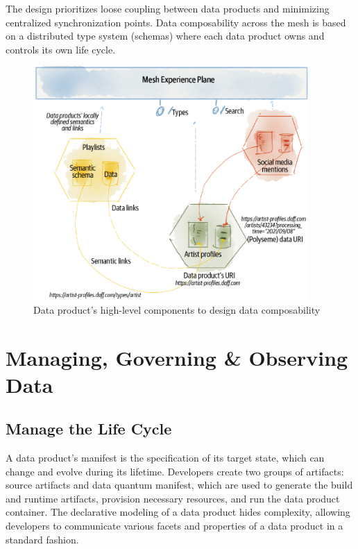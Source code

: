 \documentclass[12pt, a4paper]{book}
\begin{document}
The design prioritizes loose coupling between data products and minimizing centralized synchronization points. Data composability across the mesh is based on a distributed type system (schemas) where each data product owns and controls its own life cycle.

\begin{figure}[h]
	\begin{framed}
		\centering
		\includegraphics[width=10.5cm]{ComposeData.png}
		\caption{Data product’s high-level components to design data composability}
		\label{ComposeData}
	\end{framed}
	\vspace{-.5cm}
\end{figure}

\section{Managing, Governing \& Observing Data}
\subsection{Manage the Life Cycle}
A data product's manifest is the specification of its target state, which can change and evolve during its lifetime. Developers create two groups of artifacts: source artifacts and data quantum manifest, which are used to generate the build and runtime artifacts, provision necessary resources, and run the data product container. The declarative modeling of a data product hides complexity, allowing developers to communicate various facets and properties of a data product in a standard fashion.
\end{document}
